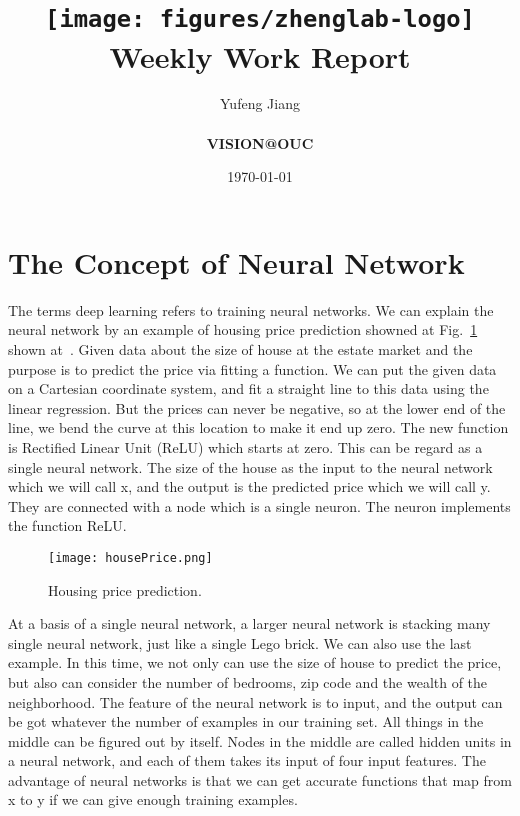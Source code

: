 \documentclass[a4paper]{article}
\title{
    \vspace*{1in}
    \texttt{[image: figures/zhenglab-logo]} \\
    \vspace*{1.2in}
    \textbf{\huge Weekly Work Report}
    \vspace{0.2in}
}
\author{Yufeng Jiang \\
    \vspace*{0.5in} \\
    \textbf{VISION@OUC} \\
    \vspace*{1in}
}
\date{\today}
\begin{document}
\maketitle
\setcounter{page}{0}
\thispagestyle{empty}
\newpage

\section{The Concept of Neural Network}

The terms deep learning refers to training neural networks. We can explain the neural network by an example of housing price prediction showned at Fig.~\ref{fig4} shown at~\cite{Neural}. Given data about the size of house at the estate market and the purpose is to predict the price via fitting a function. We can put the given data on a Cartesian coordinate system, and fit a straight line to this data using the linear regression. But the prices can never be negative, so at the lower end of the line, we bend the curve at this location to make it end up zero. The new function is Rectified Linear Unit (ReLU) which starts at zero. This can be regard as a single neural network. The size of the house as the input to the neural network which we will call x, and the output is the predicted price which we will call y. They are connected with a node which is a single neuron. The neuron implements the function ReLU.

\begin{figure}[hb]
\begin{center}
\texttt{[image: housePrice.png]}
\end{center}
\caption{Housing price prediction.}
\label{fig4}
\end{figure}

At a basis of a single neural network, a larger neural network is stacking many single neural network, just like a single Lego brick. We can also use the last example. In this time, we not only can use the size of house to predict the price, but also can consider the number of bedrooms, zip code and the wealth of the neighborhood. The feature of the neural network is to input, and the output can be got whatever the number of examples in our training set. All things in the middle can be figured out by itself. Nodes in the middle are called hidden units in a neural network, and each of them takes its input of four input features. The advantage of neural networks is that we can get accurate functions that map from x to y if we can give enough training examples.
\end{document}
